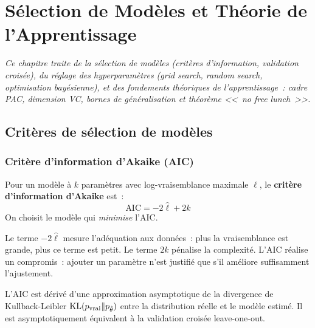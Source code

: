 \chapter{S\'election de Mod\`eles et Th\'eorie de l'Apprentissage}
\label{ch:selection}

\noindent\textit{Ce chapitre traite de la s\'election de mod\`eles (crit\`eres
d'information, validation crois\'ee), du r\'eglage des hyperparam\`etres
(grid search, random search, optimisation bay\'esienne), et des fondements
th\'eoriques de l'apprentissage~: cadre PAC, dimension VC, bornes de
g\'en\'eralisation et th\'eor\`eme <<~no free lunch~>>.}\medskip

\section{Crit\`eres de s\'election de mod\`eles}
\label{sec:criteres-selection}

\subsection{Crit\`ere d'information d'Akaike (AIC)}

\begin{definition}[AIC]
\label{def:aic}
Pour un mod\`ele \`a $k$ param\`etres avec log-vraisemblance maximale
$\hat{\ell}$, le \textbf{crit\`ere d'information d'Akaike} est~:
\begin{equation}
  \text{AIC} = -2\hat{\ell} + 2k
  \label{eq:aic}
\end{equation}
On choisit le mod\`ele qui \emph{minimise} l'AIC.
\end{definition}

\begin{intuition}[title=\textbf{Interpr\'etation de l'AIC}]
Le terme $-2\hat{\ell}$ mesure l'ad\'equation aux donn\'ees~: plus la
vraisemblance est grande, plus ce terme est petit. Le terme $2k$ p\'enalise
la complexit\'e. L'AIC r\'ealise un compromis~: ajouter un param\`etre
n'est justifi\'e que s'il am\'eliore suffisamment l'ajustement.
\end{intuition}

\begin{remarque}
L'AIC est d\'eriv\'e d'une approximation asymptotique de la divergence
de Kullback-Leibler $\mathrm{KL}(p_{\text{vrai}} \| p_{\hat{\theta}})$ entre
la distribution r\'eelle et le mod\`ele estim\'e. Il est asymptotiquement
\'equivalent \`a la validation crois\'ee leave-one-out.
\end{remarque}

